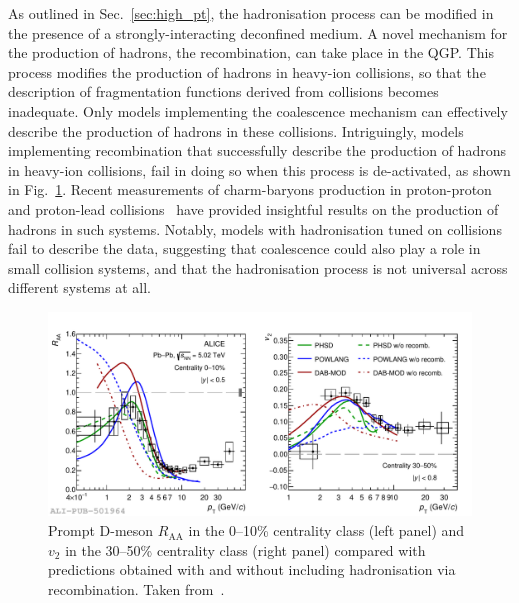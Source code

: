 As outlined in Sec.~\ref{sec:high_pt}, the hadronisation process can be modified in the presence of a strongly-interacting deconfined medium. A novel mechanism for the production of hadrons, the recombination, can take place in the QGP. This process modifies the production of hadrons in heavy-ion collisions, so that the description of fragmentation functions derived from \ee collisions becomes inadequate. Only models implementing the coalescence mechanism can effectively describe the production of hadrons in these collisions. Intriguingly, models implementing recombination that successfully describe the production of hadrons in heavy-ion collisions, fail in doing so when this process is de-activated, as shown in Fig.~\ref{fig:D_recombination}. Recent measurements of charm-baryons production in proton-proton and proton-lead collisions~\cite{ALICE:2022exq,ALICE:xic0} have provided insightful results on the production of hadrons in such systems. Notably, models with hadronisation tuned on \ee collisions fail to describe the data, suggesting that coalescence could also play a role in small collision systems, and that the hadronisation process is not universal across different systems at all.

\begin{figure}[htb]
  \centering
  \includegraphics[width=\linewidth]{Figures/Chapter 2/D_Raa010_V23050_FragCoal_3models_1.pdf}
  \caption{Prompt D-meson $R_\mathrm{AA}$ in the 0--10\% centrality class (left panel) and $v_2$ in the 30--50\% centrality class (right panel) compared with predictions obtained with and without including hadronisation via recombination. Taken from~\cite{ALICE:2021rxa}.}
  \label{fig:D_recombination}
\end{figure}

